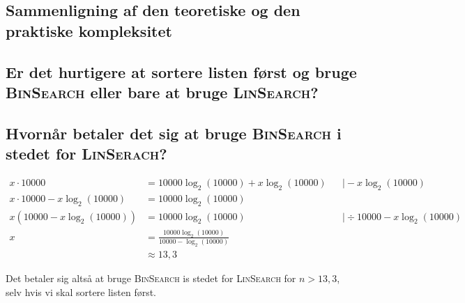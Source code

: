 \subsection{Sammenligning af den teoretiske og den praktiske kompleksitet}
\label{subsec:sammenligning-af-den-teoretiske-og-den-praktiske-kompleksitet}

\subsection{Er det hurtigere at sortere listen først og bruge \textsc{BinSearch} eller bare at bruge \textsc{
    LinSearch}?}
\label{subsec:er-det-hurtigere-at-sortere-listen-frst-og-bruge-textsc{binsearch}-eller-bare-at-bruge-textsc{linsearch}?}

\subsection{Hvornår betaler det sig at bruge \textsc{BinSearch} i stedet for \textsc{LinSerach}?}
\label{subsec:hvornar-betaler-det-sig-at-bruge-textsc{binsearch}-i-stedet-for-textsc{linserach}?}

\begin{equation}
    \begin{aligned}
        x \cdot 10000 & = 10000 \log_{2}(10000) + x \log_{2}(10000) && \mid - x \log_{2}(10000) \\
        x \cdot 10000 - x \log_{2}(10000) & = 10000 \log_{2}(10000) \\
        x \left( 10000 - x \log_{2}(10000) \right) & = 10000 \log_{2}(10000) && \mid \div 10000 - x \log_{2}(10000) \\
        x & = \frac{10000 \log_{2}(10000)}{10000 - \log_{2}(10000)} \\
        & \approx 13,3
    \end{aligned}\label{eq:equation15}
\end{equation}

Det betaler sig altså at bruge \textsc{BinSearch} is stedet for \textsc{LinSearch} for \(n > 13,3\), selv hvis vi skal
sortere listen først.
